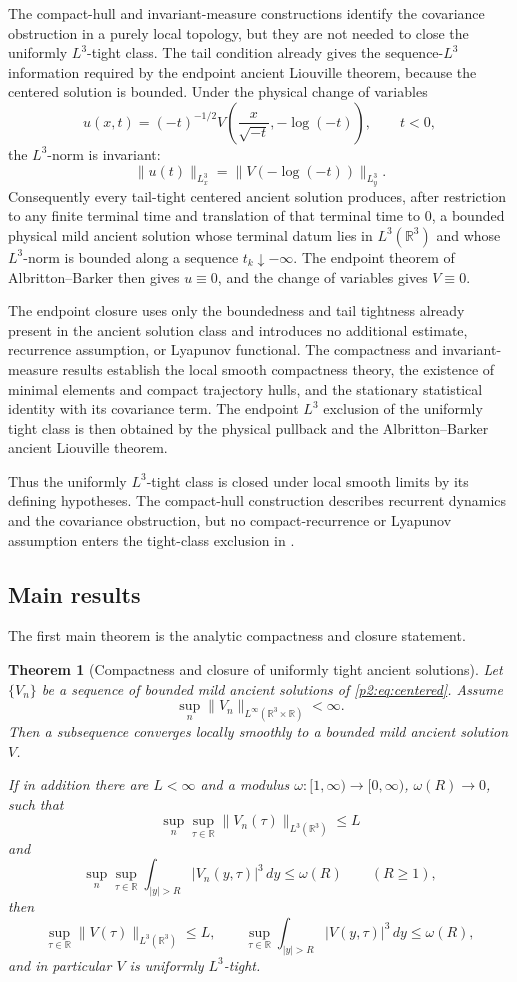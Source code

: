 \documentclass[11pt]{amsart}
\theoremstyle{plain}
\newtheorem{theorem}{Theorem}[section]
\theoremstyle{definition}
\theoremstyle{remark}
\numberwithin{equation}{section}
\newcommand{\R}{\mathbb R}
\begin{document}
The compact-hull and invariant-measure constructions identify the covariance
obstruction in a purely local topology, but they are not needed to close the
uniformly \(L^3\)-tight class.  The tail condition already gives the
sequence-\(L^3\) information required by the endpoint ancient Liouville theorem,
because the centered solution is bounded.  Under the physical change of variables
\[
   u(x,t)=(-t)^{-1/2}
   V\left(\frac{x}{\sqrt{-t}},-\log(-t)\right),
   \qquad t<0,
\]
the \(L^3\)-norm is invariant:
\[
   \|u(t)\|_{L^3_x}
   =
   \|V(-\log(-t))\|_{L^3_y}.
\]
Consequently every tail-tight centered ancient solution produces, after
restriction to any finite terminal time and translation of that terminal time
to \(0\), a bounded physical mild ancient solution whose terminal datum lies
in \(L^3(\R^3)\) and whose \(L^3\)-norm is bounded along a sequence
\(t_k\downarrow-\infty\).  The endpoint theorem of Albritton--Barker
\cite{AlbrittonBarker2019} then gives \(u\equiv0\), and the change of
variables gives \(V\equiv0\).

The endpoint closure uses only the boundedness and tail tightness already
present in the ancient solution class and introduces no additional estimate,
recurrence assumption, or Lyapunov functional.  The compactness and
invariant-measure results establish the
local smooth compactness theory, the existence of minimal elements and
compact trajectory hulls, and the stationary statistical identity with its
covariance term.  The endpoint \(L^3\) exclusion of the uniformly tight class
is then obtained by the physical pullback and the Albritton--Barker ancient
Liouville theorem.

Thus the uniformly \(L^3\)-tight class is closed under local smooth limits by
its defining hypotheses.  The compact-hull construction describes recurrent dynamics and the
covariance obstruction, but no compact-recurrence or Lyapunov assumption enters
the tight-class exclusion in .

\subsection{Main results}

The first main theorem is the analytic compactness and closure statement.

\begin{theorem}[Compactness and closure of uniformly tight ancient solutions]
\label{p2:thm:tight-compactness-intro}
Let \(\{V_n\}\) be a sequence of bounded mild ancient solutions of
\eqref{p2:eq:centered}.  Assume
\[
   \sup_n\|V_n\|_{L^\infty(\R^3\times\R)}<\infty .
\]
Then a subsequence converges locally smoothly to a bounded mild ancient
solution \(V\).

If in addition there are \(L<\infty\) and a modulus
\(\omega:[1,\infty)\to[0,\infty)\), \(\omega(R)\to0\), such that
\[
   \sup_n\sup_{\tau\in\R}\|V_n(\tau)\|_{L^3(\R^3)}\le L
\]
and
\[
   \sup_n\sup_{\tau\in\R}
   \int_{|y|>R}|V_n(y,\tau)|^3\,dy\le \omega(R)
   \qquad (R\ge1),
\]
then
\[
   \sup_{\tau\in\R}\|V(\tau)\|_{L^3(\R^3)}\le L,
   \qquad
   \sup_{\tau\in\R}\int_{|y|>R}|V(y,\tau)|^3\,dy\le\omega(R),
\]
and in particular \(V\) is uniformly \(L^3\)-tight.
\end{theorem}
\end{document}
